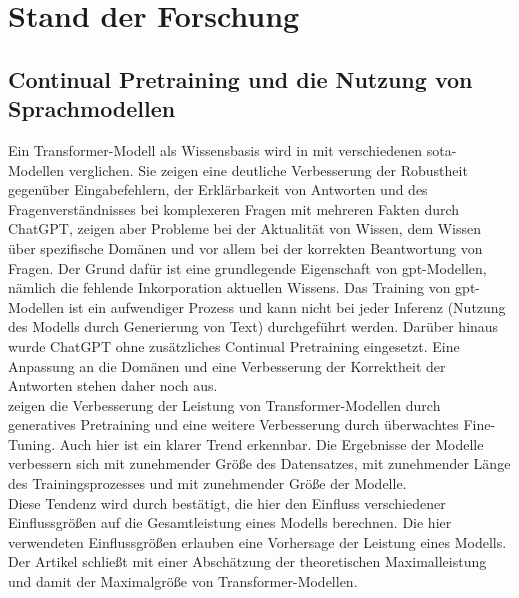 \chapter{Stand der Forschung}\label{ch:relatedWork}
\section{Continual Pretraining und die Nutzung von Sprachmodellen}

Ein Transformer-Modell als Wissensbasis wird in \citet{chatgpt_qas} mit verschiedenen \ac{sota}-Modellen verglichen. 
Sie zeigen eine deutliche Verbesserung der Robustheit gegenüber Eingabefehlern, der Erklärbarkeit von Antworten und des Fragenverständnisses bei komplexeren Fragen mit mehreren Fakten durch ChatGPT, zeigen aber Probleme bei der Aktualität von Wissen, dem Wissen über spezifische Domänen und vor allem bei der korrekten Beantwortung von Fragen. 
Der Grund dafür ist eine grundlegende Eigenschaft von \ac{gpt}-Modellen, nämlich die fehlende Inkorporation aktuellen Wissens. 
Das Training von \ac{gpt}-Modellen ist ein aufwendiger Prozess und kann nicht bei jeder Inferenz (Nutzung des Modells durch Generierung von Text) durchgeführt werden. 
Darüber hinaus wurde ChatGPT ohne zusätzliches Continual Pretraining eingesetzt.
Eine Anpassung an die Domänen und eine Verbesserung der Korrektheit der Antworten stehen daher noch aus.\\

\citet{gpt1} zeigen die Verbesserung der Leistung von Transformer-Modellen durch generatives Pretraining und eine weitere Verbesserung durch überwachtes Fine-Tuning.
Auch hier ist ein klarer Trend erkennbar. Die Ergebnisse der Modelle verbessern sich mit zunehmender Größe des Datensatzes, mit zunehmender Länge des Trainingsprozesses und mit zunehmender Größe der Modelle.\\

Diese Tendenz wird durch \citet{scaling_laws} bestätigt, die hier den Einfluss verschiedener Einflussgrößen auf die Gesamtleistung eines Modells berechnen. Die hier verwendeten Einflussgrößen erlauben eine Vorhersage der Leistung eines Modells. 
Der Artikel schließt mit einer Abschätzung der theoretischen Maximalleistung und damit der Maximalgröße von Transformer-Modellen.\\

